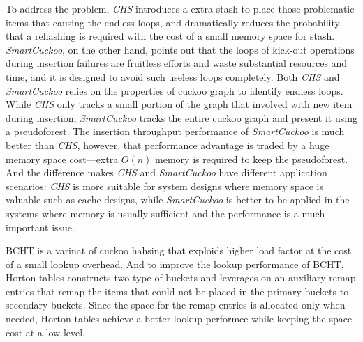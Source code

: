 \documentclass[12pt,conference,compsoc]{IEEEtran}
\begin{document}
To address the problem, \textit{CHS} introduces a extra stash to place those problematic items that causing the endless loops, and dramatically reduces the probability that a rehashing is required with the cost of a small memory space for stash. \textit{SmartCuckoo}, on the other hand, points out that the loops of kick-out operations during insertion failures are fruitless efforts and waste substantial resources and time, and it is designed to avoid such useless loops completely. Both \textit{CHS} and \textit{SmartCuckoo} relies on the properties of cuckoo graph to identify endless loops. While \textit{CHS} only tracks a small portion of the graph that involved with new item during insertion, \textit{SmartCuckoo} tracks the entire cuckoo graph and present it using a pseudoforest. The insertion throughput performance of \textit{SmartCuckoo} is much better than \textit{CHS}, however, that performance advantage is traded by a huge memory space cost---extra $O(n)$ memory is required to keep the pseudoforest. And the difference makes \textit{CHS} and \textit{SmartCuckoo} have different application scenarios: \textit{CHS} is more suitable for system designs where memory space is valuable such as cache designs, while \textit{SmartCuckoo} is better to be applied in the systems where memory is usually sufficient and the performance is a much important issue.

BCHT is a varinat of cuckoo hahsing that exploids higher load factor at the cost of a small lookup overhead. And to improve the lookup performance of BCHT, Horton tables constructs two type of buckets and leverages on an auxiliary remap entries that remap the items that could not be placed in the primary buckets to secondary buckets. Since the space for the remap entries is allocated only when needed, Horton tables achieve a better lookup performce while keeping the space cost at a low level.
%
%
\end{document}
